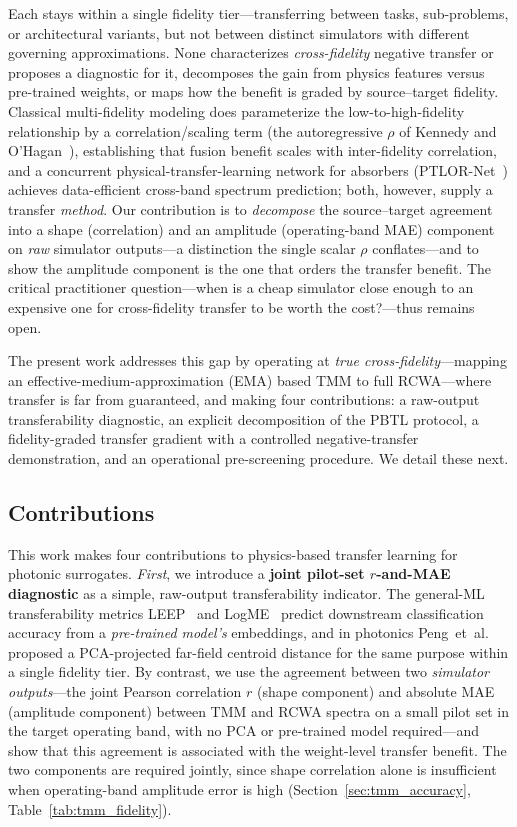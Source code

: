 \documentclass[a4paper,fleqn]{cas-sc}
\begin{document}
Each stays within a single fidelity tier---transferring between tasks, sub-problems, or architectural variants, but not between distinct simulators with different governing approximations. None characterizes \emph{cross-fidelity} negative transfer or proposes a diagnostic for it, decomposes the gain from physics features versus pre-trained weights, or maps how the benefit is graded by source--target fidelity. Classical multi-fidelity modeling does parameterize the low-to-high-fidelity relationship by a correlation/scaling term (the autoregressive $\rho$ of Kennedy and O'Hagan~\cite{kennedy2000predicting}), establishing that fusion benefit scales with inter-fidelity correlation, and a concurrent physical-transfer-learning network for absorbers (PTLOR-Net~\cite{zhu2025ptlor}) achieves data-efficient cross-band spectrum prediction; both, however, supply a transfer \emph{method}. Our contribution is to \emph{decompose} the source--target agreement into a shape (correlation) and an amplitude (operating-band MAE) component on \emph{raw} simulator outputs---a distinction the single scalar $\rho$ conflates---and to show the amplitude component is the one that orders the transfer benefit. The critical practitioner question---when is a cheap simulator close enough to an expensive one for cross-fidelity transfer to be worth the cost?---thus remains open.

The present work addresses this gap by operating at \emph{true cross-fidelity}---mapping an effective-medium-approximation (EMA) based TMM to full RCWA---where transfer is far from guaranteed, and making four contributions: a raw-output transferability diagnostic, an explicit decomposition of the PBTL protocol, a fidelity-graded transfer gradient with a controlled negative-transfer demonstration, and an operational pre-screening procedure. We detail these next.

\subsection{Contributions}

This work makes four contributions to physics-based transfer learning for photonic surrogates. \emph{First}, we introduce a \textbf{joint pilot-set $r$-and-MAE diagnostic} as a simple, raw-output transferability indicator. The general-ML transferability metrics LEEP~\cite{nguyen2020leep} and LogME~\cite{you2021logme} predict downstream classification accuracy from a \emph{pre-trained model's} embeddings, and in photonics Peng~et~al.~\cite{peng2024nanophotonics} proposed a PCA-projected far-field centroid distance for the same purpose within a single fidelity tier. By contrast, we use the agreement between two \emph{simulator outputs}---the joint Pearson correlation $r$ (shape component) and absolute MAE (amplitude component) between TMM and RCWA spectra on a small pilot set in the target operating band, with no PCA or pre-trained model required---and show that this agreement is associated with the weight-level transfer benefit. The two components are required jointly, since shape correlation alone is insufficient when operating-band amplitude error is high (Section~\ref{sec:tmm_accuracy}, Table~\ref{tab:tmm_fidelity}).
\end{document}
